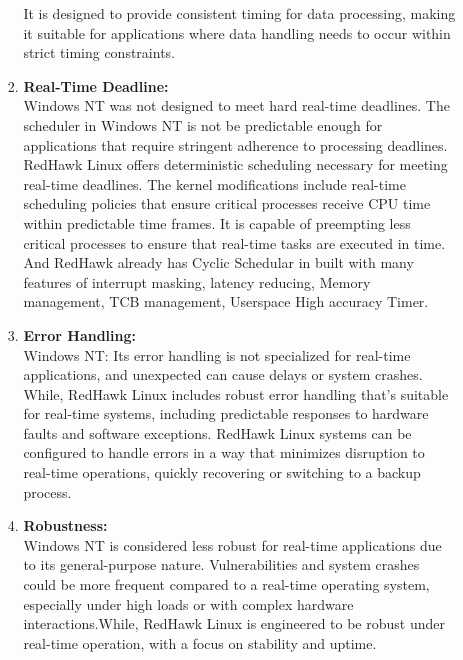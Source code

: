 \documentclass[a4paper,11pt]{article}%
\newenvironment{qanda}{\setlength{\parindent}{0pt}}{\bigskip}
\begin{document}
\begin{qanda}
\begin{enumerate}
\begin{enumerate}
\begin{enumerate}
					            It is designed to provide consistent timing for data processing, making it suitable for applications where data handling needs to occur within strict timing constraints.
					      \item \textbf{Real-Time Deadline:}\\
					            Windows NT was not designed to meet hard real-time deadlines. The scheduler in Windows NT is not be predictable enough for applications that require stringent adherence to processing deadlines.
					            RedHawk Linux offers deterministic scheduling necessary for meeting real-time deadlines. The kernel modifications include real-time scheduling policies that ensure critical processes receive CPU time within predictable time frames.
					            It is capable of preempting less critical processes to ensure that real-time tasks are executed in time.
								And RedHawk already has Cyclic Schedular in built with many features of interrupt masking, latency reducing, Memory management, TCB management, Userspace High accuracy Timer.
					      \item \textbf{Error Handling:}\\
					            Windows NT: Its error handling is not specialized for real-time applications, and unexpected can cause delays or system crashes. While, RedHawk Linux includes robust error handling that's suitable for real-time systems, including predictable responses to hardware faults and software exceptions. RedHawk Linux systems can be configured to handle errors in a way that minimizes disruption to real-time operations, quickly recovering or switching to a backup process.
					      \item \textbf{Robustness:}\\
					            Windows NT is considered less robust for real-time applications due to its general-purpose nature. Vulnerabilities and system crashes could be more frequent compared to a real-time operating system, especially under high loads or with complex hardware interactions.While, RedHawk Linux is engineered to be robust under real-time operation, with a focus on stability and uptime.
				      \end{enumerate}

			\end{enumerate}

	\end{enumerate}





\end{qanda}
\end{document}

